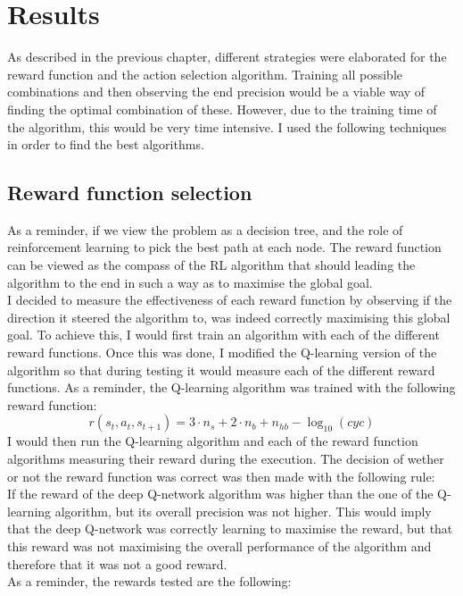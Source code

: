 
\chapter{Results}
As described in the previous chapter, different strategies were elaborated for the reward function and the action selection algorithm. Training all possible combinations and then observing the end precision would be a viable way of finding the optimal combination of these. However, due to the training time of the algorithm, this would be very time intensive. I used the following techniques in order to find the best algorithms.
\section{Reward function selection}
As a reminder, if we view the problem as a decision tree, and the role of reinforcement learning to pick the best path at each node. The reward function can be viewed as the compass of the RL algorithm that should leading the algorithm to the end in such a way as to maximise the global goal.\\
I decided to measure the effectiveness of each reward function by observing if the direction it steered the algorithm to, was indeed correctly maximising this global goal. To achieve this, I would first train an algorithm with each of the different reward functions. Once this was done, I modified the Q-learning version of the algorithm so that during testing it would measure each of the different reward functions. As a reminder, the Q-learning algorithm was trained with the following reward function:
\begin{equation}
	r(s_t,a_t,s_{t+1}) = 3  \cdot n_s + 2 \cdot n_b + n_{hb} - \log_{10}(cyc)
\end{equation}
I would then run the Q-learning algorithm and each of the reward function algorithms measuring their reward during the execution. The decision of wether or not the reward function was correct was then made with the following rule:\\
If the reward of the deep Q-network algorithm was higher than the one of the Q-learning algorithm, but its overall precision was not higher. This would imply that the deep Q-network was correctly learning to maximise the reward, but that this reward was not maximising the overall performance of the algorithm and therefore that it was not a good reward.\\
As a reminder, the rewards tested are the following:
 
